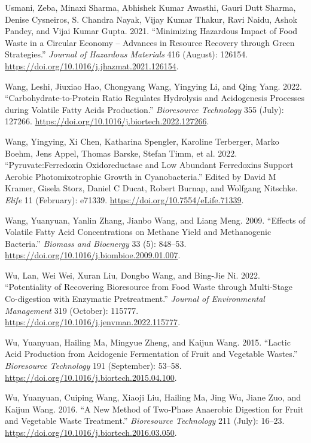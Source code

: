 \documentclass[11pt]{report}
\begin{document}
\begin{hangparas}{1.5em}{1}
\hypertarget{citeproc_bib_item_78}{Usmani, Zeba, Minaxi Sharma, Abhishek Kumar Awasthi, Gauri Dutt Sharma, Denise Cysneiros, S. Chandra Nayak, Vijay Kumar Thakur, Ravi Naidu, Ashok Pandey, and Vijai Kumar Gupta. 2021. “Minimizing Hazardous Impact of Food Waste in a Circular Economy – Advances in Resource Recovery through Green Strategies.” \textit{Journal of Hazardous Materials} 416 (August): 126154. \url{https://doi.org/10.1016/j.jhazmat.2021.126154}.}

\hypertarget{citeproc_bib_item_79}{Wang, Leshi, Jiuxiao Hao, Chongyang Wang, Yingying Li, and Qing Yang. 2022. “Carbohydrate-to-Protein Ratio Regulates Hydrolysis and Acidogenesis Processes during Volatile Fatty Acids Production.” \textit{Bioresource Technology} 355 (July): 127266. \url{https://doi.org/10.1016/j.biortech.2022.127266}.}

\hypertarget{citeproc_bib_item_80}{Wang, Yingying, Xi Chen, Katharina Spengler, Karoline Terberger, Marko Boehm, Jens Appel, Thomas Barske, Stefan Timm, et al. 2022. “Pyruvate:Ferredoxin Oxidoreductase and Low Abundant Ferredoxins Support Aerobic Photomixotrophic Growth in Cyanobacteria.” Edited by David M Kramer, Gisela Storz, Daniel C Ducat, Robert Burnap, and Wolfgang Nitschke. \textit{Elife} 11 (February): e71339. \url{https://doi.org/10.7554/eLife.71339}.}

\hypertarget{citeproc_bib_item_81}{Wang, Yuanyuan, Yanlin Zhang, Jianbo Wang, and Liang Meng. 2009. “Effects of Volatile Fatty Acid Concentrations on Methane Yield and Methanogenic Bacteria.” \textit{Biomass and Bioenergy} 33 (5): 848–53. \url{https://doi.org/10.1016/j.biombioe.2009.01.007}.}

\hypertarget{citeproc_bib_item_82}{Wu, Lan, Wei Wei, Xuran Liu, Dongbo Wang, and Bing-Jie Ni. 2022. “Potentiality of Recovering Bioresource from Food Waste through Multi-Stage Co-digestion with Enzymatic Pretreatment.” \textit{Journal of Environmental Management} 319 (October): 115777. \url{https://doi.org/10.1016/j.jenvman.2022.115777}.}

\hypertarget{citeproc_bib_item_83}{Wu, Yuanyuan, Hailing Ma, Mingyue Zheng, and Kaijun Wang. 2015. “Lactic Acid Production from Acidogenic Fermentation of Fruit and Vegetable Wastes.” \textit{Bioresource Technology} 191 (September): 53–58. \url{https://doi.org/10.1016/j.biortech.2015.04.100}.}

\hypertarget{citeproc_bib_item_84}{Wu, Yuanyuan, Cuiping Wang, Xiaoji Liu, Hailing Ma, Jing Wu, Jiane Zuo, and Kaijun Wang. 2016. “A New Method of Two-Phase Anaerobic Digestion for Fruit and Vegetable Waste Treatment.” \textit{Bioresource Technology} 211 (July): 16–23. \url{https://doi.org/10.1016/j.biortech.2016.03.050}.}


\end{hangparas}
\end{document}
